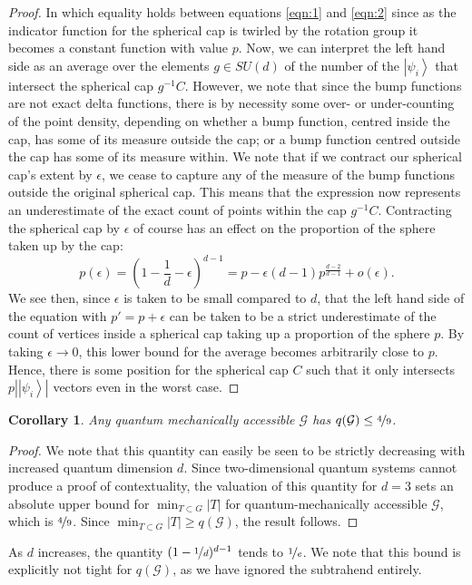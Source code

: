 \documentclass{amsart}
\newtheorem{cor}{Corollary}
\theoremstyle{definition}
\newcommand{\ket}[1]{{\left\vert{#1}\right\rangle}}
\begin{document}
\begin{proof}
In which equality holds between equations \ref{eqn:1} and \ref{eqn:2} since as the indicator function for the spherical cap is twirled by the rotation group it becomes a constant function with value $p$. Now, we can interpret the left hand side as an average over the elements $g\in SU(d)$ of the number of the $\ket{\psi_i}$ that intersect the spherical cap $g^{-1}C$. However, we note that since the bump functions are not exact delta functions, there is by necessity some over- or under-counting of the point density, depending on whether a bump function, centred inside the cap, has some of its measure outside the cap; or a bump function centred outside the cap has some of its measure within. We note that if we contract our spherical cap's extent by $\epsilon$, we cease to capture any of the measure of the bump functions outside the original spherical cap. This means that the expression now represents an underestimate of the exact count of points within the cap $g^{-1}C$. Contracting the spherical cap by $\epsilon$ of course has an effect on the proportion of the sphere taken up by the cap:
\begin{equation}
p(\epsilon)=\left(1-\frac{1}{d}-\epsilon\right)^{d-1}=p-\epsilon(d-1) p^{\frac{d-2}{d-1}} +o(\epsilon).
\end{equation}
We see then, since $\epsilon$ is taken to be small compared to $d$, that the left hand side of the equation with $p'=p+\epsilon$ can be taken to be a strict underestimate of the count of vertices inside a spherical cap taking up a proportion of the sphere $p$. By taking $\epsilon\rightarrow0$, this lower bound for the average becomes arbitrarily close to $p$. Hence, there is some position for the spherical cap $C$ such that it only intersects $p\left|\ket{\psi_i}\right|$ vectors even in the worst case.

\end{proof} 
\begin{cor}
Any quantum mechanically accessible $\mathcal{G}$ has  $q(\mathcal{G})\leq\nicefrac49$.
\end{cor}
\begin{proof}
We note that this quantity can easily be seen to be strictly decreasing with increased quantum dimension $d$. Since two-dimensional quantum systems cannot produce a proof of contextuality, the valuation of this quantity for $d=3$ sets an absolute upper bound for $\min_{T\subset G}|T|$ for quantum-mechanically accessible $\mathcal{G}$, which is $\nicefrac49$. Since $\min_{T\subset G}|T|\geq q(\mathcal{G})$, the result follows.
\end{proof}
As $d$ increases, the quantity $(1-\nicefrac1d)^{d-1}$ tends to $\nicefrac1e$. We note that this bound is explicitly not tight for $q(\mathcal{G})$, as we have ignored the subtrahend entirely. %
\end{document}
